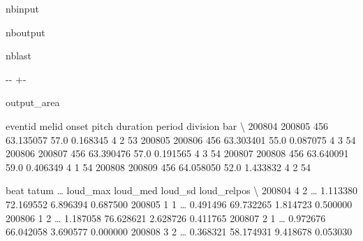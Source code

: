 \documentclass[letterpaper,10pt,english]{sphinxmanual}
\newlength\nbsphinxcodecellspacing
\begin{document}
\begin{sphinxuseclass}{nbinput}
{
\begin{sphinxVerbatim}[commandchars=\\\{\}]
\llap{\color{nbsphinxin}[30]:\,\hspace{\fboxrule}\hspace{\fboxsep}}
\end{sphinxVerbatim}
}

\end{sphinxuseclass}
\begin{sphinxuseclass}{nboutput}
\begin{sphinxuseclass}{nblast}
{

\kern-\sphinxverbatimsmallskipamount\kern-\baselineskip
\kern+\FrameHeightAdjust\kern-\fboxrule
\vspace{\nbsphinxcodecellspacing}

\begin{sphinxuseclass}{output_area}
\begin{sphinxuseclass}{}


\begin{sphinxVerbatim}[commandchars=\\\{\}]
\llap{\color{nbsphinxout}[30]:\,\hspace{\fboxrule}\hspace{\fboxsep}}        eventid  melid      onset  pitch  duration  period  division  bar  \textbackslash{}
200804   200805    456  63.135057   57.0  0.168345       4         2   53
200805   200806    456  63.303401   55.0  0.087075       4         3   54
200806   200807    456  63.390476   57.0  0.191565       4         3   54
200807   200808    456  63.640091   59.0  0.406349       4         1   54
200808   200809    456  64.058050   52.0  1.433832       4         2   54

        beat  tatum  {\ldots}  loud\_max   loud\_med   loud\_sd loud\_relpos  \textbackslash{}
200804     4      2  {\ldots}  1.113380  72.169552  6.896394    0.687500
200805     1      1  {\ldots}  0.491496  69.732265  1.814723    0.500000
200806     1      2  {\ldots}  1.187058  76.628621  2.628726    0.411765
200807     2      1  {\ldots}  0.972676  66.042058  3.690577    0.000000
200808     3      2  {\ldots}  0.368321  58.174931  9.418678    0.053030


\end{sphinxVerbatim}
\end{sphinxuseclass}
\end{sphinxuseclass}}
\end{sphinxuseclass}
\end{sphinxuseclass}
\end{document}
